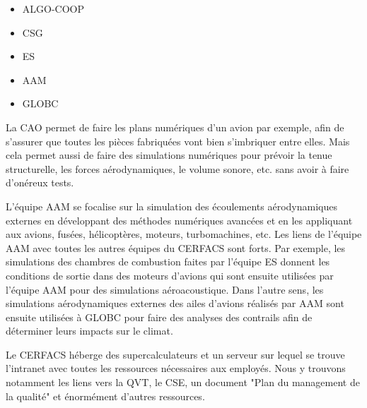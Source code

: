 
\begin{itemize}
    \item \ac{ALGO-COOP}
    \item \ac{CSG}
    \item \ac{ES}
    \item \ac{AAM}
    \item \ac{GLOBC}
\end{itemize}



La \ac{CAO} permet de faire les plans numériques d'un avion par exemple, afin de s'assurer que toutes les pièces fabriquées vont bien s'imbriquer entre elles. Mais cela permet aussi de faire des simulations numériques pour prévoir la tenue structurelle, les forces aérodynamiques, le volume sonore, etc. sans avoir à faire d'onéreux tests.

L'équipe AAM se focalise sur la simulation des écoulements aérodynamiques externes en développant des méthodes numériques avancées et en les appliquant aux avions, fusées, hélicoptères, moteurs, turbomachines, etc.
Les liens de l’équipe AAM avec toutes les autres équipes du CERFACS sont forts.
Par exemple, les simulations des chambres de combustion faites par l'équipe ES donnent les conditions de sortie dans des moteurs d'avions qui sont ensuite utilisées par l'équipe AAM pour des simulations aéroacoustique.
Dans l'autre sens, les simulations aérodynamiques externes des ailes d'avions réalisés par AAM sont ensuite utilisées à GLOBC pour faire des analyses des contrails afin de déterminer leurs impacts sur le climat.


Le CERFACS héberge des supercalculateurs et un serveur sur lequel se trouve l'intranet avec toutes les ressources nécessaires aux employés.  %
Nous y trouvons notamment les liens vers la \ac{QVT}, le \ac{CSE}, un document "Plan du management de la qualité" et énormément d'autres ressources.


